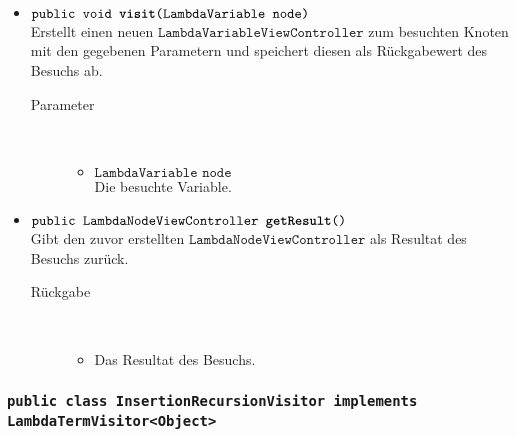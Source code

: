 \begin{description}
\begin{itemize}
		\item $\texttt{public void \textbf{visit}(LambdaVariable node)}$ \\ Erstellt einen neuen $\texttt{LambdaVariableViewController}$ zum besuchten Knoten mit den gegebenen Parametern und speichert diesen als Rückgabewert des Besuchs ab.
		\begin{description}
			\item[Parameter] \hfill \\
			\vspace{-.8cm}
			\begin{itemize}
				\item $\texttt{LambdaVariable node}$ \\ Die besuchte Variable.
			\end{itemize}
		\end{description}
		
		\item $\texttt{public LambdaNodeViewController \textbf{getResult}()}$ \\ Gibt den zuvor erstellten $\texttt{LambdaNodeViewController}$ als Resultat des Besuchs zurück.
		\begin{description}
			\item[Rückgabe] \hfill \\
			\vspace{-.8cm}
			\begin{itemize}
				\item Das Resultat des Besuchs.
			\end{itemize}
		\end{description}
	\end{itemize}
\end{description}

\subsubsection{\normalfont \texttt{public class \textbf{InsertionRecursionVisitor} implements LambdaTermVisitor<Object>}}

